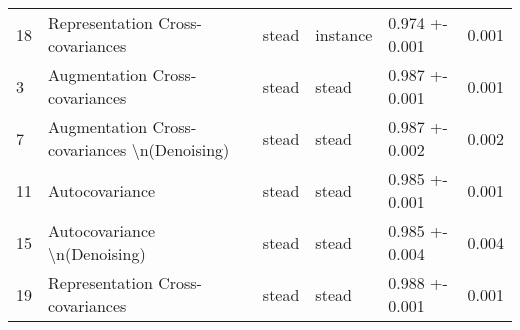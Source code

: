 \begin{tabular}{lllllr}
18 &              Representation Cross-covariances &            stead &        instance &  0.974 +- 0.001 &        0.001 \\
3  &                Augmentation Cross-covariances &            stead &           stead &  0.987 +- 0.001 &        0.001 \\
7  &  Augmentation Cross-covariances \textbackslash n(Denoising) &            stead &           stead &  0.987 +- 0.002 &        0.002 \\
11 &                                Autocovariance &            stead &           stead &  0.985 +- 0.001 &        0.001 \\
15 &                  Autocovariance \textbackslash n(Denoising) &            stead &           stead &  0.985 +- 0.004 &        0.004 \\
19 &              Representation Cross-covariances &            stead &           stead &  0.988 +- 0.001 &        0.001 \\
\bottomrule
\end{tabular}
